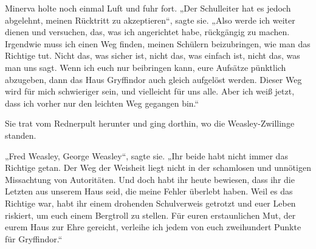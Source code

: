 \later

Minerva holte noch einmal Luft und fuhr fort.
„Der Schulleiter hat es jedoch abgelehnt, meinen Rücktritt zu akzeptieren“, sagte sie.
„Also werde ich weiter dienen und versuchen, das, was ich angerichtet habe, rückgängig zu machen. Irgendwie muss ich einen Weg finden, meinen Schülern beizubringen, wie man das Richtige tut. Nicht das, was sicher ist, nicht das, was einfach ist, nicht das, was man uns sagt. Wenn ich euch nur beibringen kann, eure Aufsätze pünktlich abzugeben, dann das Haus Gryffindor auch gleich aufgelöst werden. Dieser Weg wird für mich schwieriger sein, und vielleicht für uns alle. Aber ich weiß jetzt, dass ich vorher nur den leichten Weg gegangen bin.“

Sie trat vom Rednerpult herunter und ging dorthin, wo die Weasley-Zwillinge standen.

„Fred Weasley, George Weasley“, sagte sie.
„Ihr beide habt nicht immer das Richtige getan. Der Weg der Weisheit liegt nicht in der schamlosen und unnötigen Missachtung von Autoritäten. Und doch habt ihr heute bewiesen, dass ihr die Letzten aus unserem Haus seid, die meine Fehler überlebt haben. Weil es das Richtige war, habt ihr einem drohenden Schulverweis getrotzt und euer Leben riskiert, um euch einem Bergtroll zu stellen. Für euren erstaunlichen Mut, der eurem Haus zur Ehre gereicht, verleihe ich jedem von euch zweihundert Punkte für Gryffindor.“

